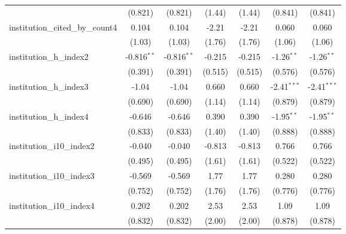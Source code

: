 \begin{tabular}{lcccccc}
                                         & (0.821)       & (0.821)       & (1.44)        & (1.44)        & (0.841)       & (0.841)\\   
   institution\_cited\_by\_count4        & 0.104         & 0.104         & -2.21         & -2.21         & 0.060         & 0.060\\   
                                         & (1.03)        & (1.03)        & (1.76)        & (1.76)        & (1.06)        & (1.06)\\   
   institution\_h\_index2                & -0.816$^{**}$ & -0.816$^{**}$ & -0.215        & -0.215        & -1.26$^{**}$  & -1.26$^{**}$\\   
                                         & (0.391)       & (0.391)       & (0.515)       & (0.515)       & (0.576)       & (0.576)\\   
   institution\_h\_index3                & -1.04         & -1.04         & 0.660         & 0.660         & -2.41$^{***}$ & -2.41$^{***}$\\   
                                         & (0.690)       & (0.690)       & (1.14)        & (1.14)        & (0.879)       & (0.879)\\   
   institution\_h\_index4                & -0.646        & -0.646        & 0.390         & 0.390         & -1.95$^{**}$  & -1.95$^{**}$\\   
                                         & (0.833)       & (0.833)       & (1.40)        & (1.40)        & (0.888)       & (0.888)\\   
   institution\_i10\_index2              & -0.040        & -0.040        & -0.813        & -0.813        & 0.766         & 0.766\\   
                                         & (0.495)       & (0.495)       & (1.61)        & (1.61)        & (0.522)       & (0.522)\\   
   institution\_i10\_index3              & -0.569        & -0.569        & 1.77          & 1.77          & 0.280         & 0.280\\   
                                         & (0.752)       & (0.752)       & (1.76)        & (1.76)        & (0.776)       & (0.776)\\   
   institution\_i10\_index4              & 0.202         & 0.202         & 2.53          & 2.53          & 1.09          & 1.09\\   
                                         & (0.832)       & (0.832)       & (2.00)        & (2.00)        & (0.878)       & (0.878)\\   

\end{tabular}
